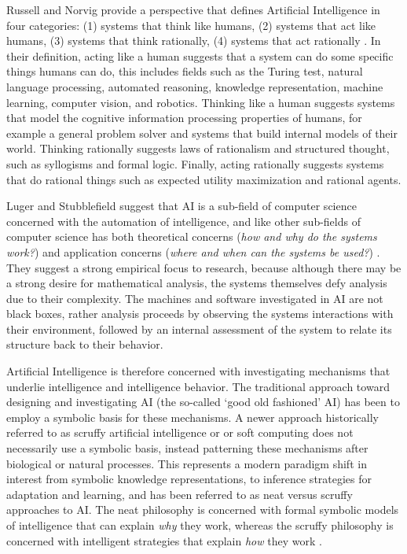 Russell and Norvig provide a perspective that defines Artificial Intelligence in four categories: (1) systems that think like humans, (2) systems that act like humans, (3) systems that think rationally, (4) systems that act rationally \cite{Russell2009}. In their definition, acting like a human suggests that a system can do some specific things humans can do, this includes fields such as the Turing test, natural language processing, automated reasoning, knowledge representation, machine learning, computer vision, and robotics. Thinking like a human suggests systems that model the cognitive information processing properties of humans, for example a general problem solver and systems that build internal models of their world. Thinking rationally suggests laws of rationalism and structured thought, such as syllogisms and formal logic. Finally, acting rationally suggests systems that do rational things such as expected utility maximization and rational agents. 

Luger and Stubblefield suggest that AI is a sub-field of computer science concerned with the automation of intelligence, and like other sub-fields of computer science has both theoretical concerns (\emph{how and why do the systems work?}) and application concerns (\emph{where and when can the systems be used?}) \cite{Luger1993}. They suggest a strong empirical focus to research, because although there may be a strong desire for mathematical analysis, the systems themselves defy analysis due to their complexity. The machines and software investigated in AI are not black boxes, rather analysis proceeds by observing the systems interactions with their environment, followed by an internal assessment of the system to relate its structure back to their behavior.

Artificial Intelligence is therefore concerned with investigating mechanisms that underlie intelligence and intelligence behavior. The traditional approach toward designing and investigating AI (the so-called `good old fashioned' AI) has been to employ a symbolic basis for these mechanisms. A newer approach historically referred to as scruffy artificial intelligence or or soft computing does not necessarily use a symbolic basis, instead patterning these mechanisms after biological or natural processes. This represents a modern paradigm shift in interest from symbolic knowledge representations, to inference strategies for adaptation and learning, and has been referred to as neat versus scruffy approaches to AI. The neat philosophy is concerned with formal symbolic models of intelligence that can explain \emph{why} they work, whereas the scruffy philosophy is concerned with intelligent strategies that explain \emph{how} they work \cite{Sloman1990}.

